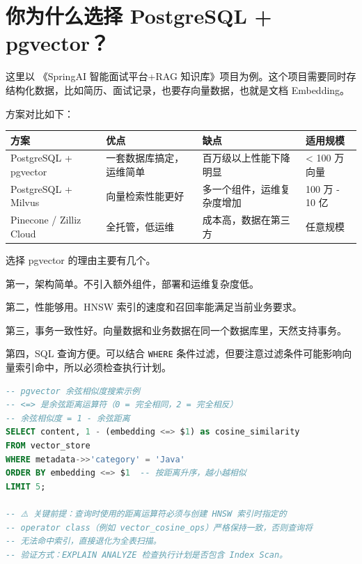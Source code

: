 \documentclass[10pt,a4paper]{ctexart}
\begin{document}
\section{你为什么选择 PostgreSQL + pgvector？}


这里以 《SpringAI 智能面试平台+RAG 知识库》项目为例。这个项目需要同时存结构化数据，比如简历、面试记录，也要存向量数据，也就是文档 Embedding。



方案对比如下：


{\footnotesize
\begin{tabularx}{\textwidth}{|X|X|X|X|}
\hline
\textbf{方案} & \textbf{优点} & \textbf{缺点} & \textbf{适用规模} \\
\hline
PostgreSQL + pgvector & 一套数据库搞定，运维简单 & 百万级以上性能下降明显 & < 100 万向量 \\
\hline
PostgreSQL + Milvus & 向量检索性能更好 & 多一个组件，运维复杂度增加 & 100 万 - 10 亿 \\
\hline
Pinecone / Zilliz Cloud & 全托管，低运维 & 成本高，数据在第三方 & 任意规模 \\
\hline
\end{tabularx}
}



选择 pgvector 的理由主要有几个。



第一，架构简单。不引入额外组件，部署和运维复杂度低。



第二，性能够用。HNSW 索引的速度和召回率能满足当前业务要求。



第三，事务一致性好。向量数据和业务数据在同一个数据库里，天然支持事务。



第四，SQL 查询方便。可以结合 \texttt{WHERE} 条件过滤，但要注意过滤条件可能影响向量索引命中，所以必须检查执行计划。



\begin{lstlisting}[language=SQL]
-- pgvector 余弦相似度搜索示例
-- <=> 是余弦距离运算符（0 = 完全相同，2 = 完全相反）
-- 余弦相似度 = 1 - 余弦距离
SELECT content, 1 - (embedding <=> $1) as cosine_similarity
FROM vector_store
WHERE metadata->>'category' = 'Java'
ORDER BY embedding <=> $1  -- 按距离升序，越小越相似
LIMIT 5;

-- ⚠️ 关键前提：查询时使用的距离运算符必须与创建 HNSW 索引时指定的
-- operator class（例如 vector_cosine_ops）严格保持一致，否则查询将
-- 无法命中索引，直接退化为全表扫描。
-- 验证方式：EXPLAIN ANALYZE 检查执行计划是否包含 Index Scan。
\end{lstlisting}
\end{document}
